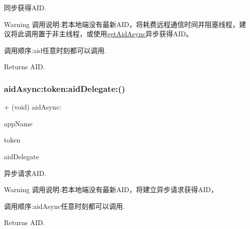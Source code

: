 同步获得\+A\+ID. 

\begin{DoxyWarning}{Warning}
调用说明\+:若本地端没有最新\+A\+I\+D，将耗费远程通信时间并阻塞线程，建议将此调用置于非主线程，或使用\mbox{\hyperlink{}{get\+Aid\+Async}}异步获得\+A\+I\+D。 \begin{DoxyVerb}                         调用顺序:aid任意时刻都可以调用.
\end{DoxyVerb}

\end{DoxyWarning}
\begin{DoxyReturn}{Returns}
A\+ID. 
\end{DoxyReturn}
\mbox{\label{interface_u_t_device_a3298d219e8f1c7d2de24e68828cf347b}} 
\subsubsection{\texorpdfstring{aid\+Async\+:token\+:aid\+Delegate\+:()}{aidAsync:token:aidDelegate:()}}
{\footnotesize\ttfamily + (void) aid\+Async\+: \begin{DoxyParamCaption}\item[{(N\+S\+String $\ast$)}]{app\+Name }\item[{token:(N\+S\+String $\ast$)}]{token }\item[{aidDelegate:(id$<$ Aid\+Protocol\+Delegate $>$)}]{aid\+Delegate }\end{DoxyParamCaption}}



异步请求\+A\+ID. 

\begin{DoxyWarning}{Warning}
调用说明\+:若本地端没有最新\+A\+I\+D，将建立异步请求获得\+A\+I\+D， \begin{DoxyVerb}                         调用顺序:aidAsync任意时刻都可以调用.
\end{DoxyVerb}

\end{DoxyWarning}
\begin{DoxyReturn}{Returns}
A\+ID. 
\end{DoxyReturn}
\mbox{\label{interface_u_t_device_a679ac9f6e75a769943db507089abb879}} 
